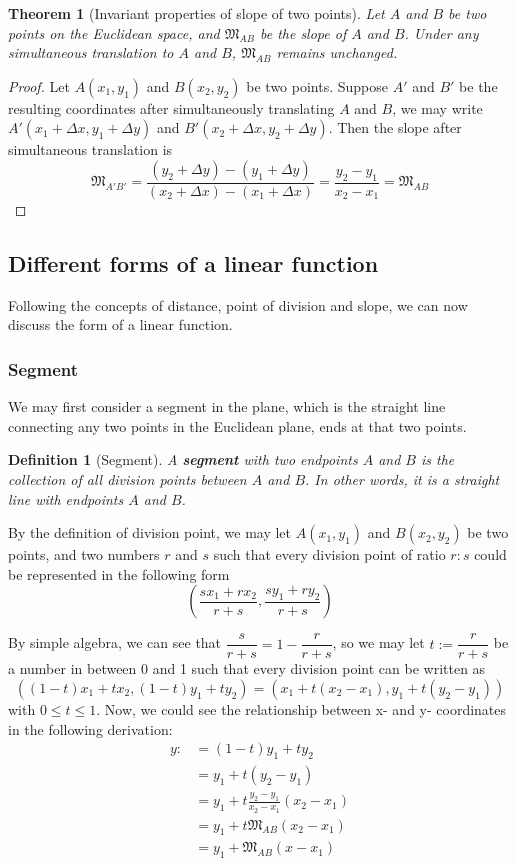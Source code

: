 \documentclass[12pt]{article}
\newtheorem{definition}{Definition}[section]
\newtheorem*{theorem}{Theorem}
\begin{document}
    \begin{theorem}[Invariant properties of slope of two points]
        Let $A$ and $B$ be two points on the Euclidean space, and $\mathfrak{M}_{AB}$ be the slope of $A$ and $B$. Under any simultaneous translation to $A$ and $B$, $\mathfrak{M}_{AB}$ remains unchanged.
    \end{theorem}

    \begin{proof}
        Let $A(x_1,y_1)$ and $B(x_2,y_2)$ be two points. Suppose $A'$ and $B'$ be the resulting coordinates after simultaneously translating $A$ and $B$, we may write $A'(x_1+\Delta x, y_1+\Delta y)$ and $B'(x_2+\Delta x, y_2+\Delta y)$. Then the slope after simultaneous translation is $$\mathfrak{M}_{A'B'}=\frac{(y_2+\Delta y)-(y_1+\Delta y)}{(x_2+\Delta x)-(x_1+\Delta x)}=\frac{y_2-y_1}{x_2-x_1}=\mathfrak{M}_{AB}$$
    \end{proof}

    \subsection{Different forms of a linear function}

    Following the concepts of distance, point of division and slope, we can now discuss the form of a linear function.

    \subsubsection*{Segment}

    We may first consider a segment in the plane, which is the straight line connecting any two points in the Euclidean plane, ends at that two points.

    \begin{definition}[Segment]
        A \textbf{segment} with two endpoints $A$ and $B$ is the collection of all division points between $A$ and $B$. In other words, it is a straight line with endpoints $A$ and $B$.
    \end{definition}

    By the definition of division point, we may let $A(x_1,y_1)$ and $B(x_2,y_2)$ be two points, and two numbers $r$ and $s$ such that every division point of ratio $r:s$ could be represented in the following form $$(\frac{sx_1+rx_2}{r+s},\frac{sy_1+ry_2}{r+s})$$

    By simple algebra, we can see that $\dfrac{s}{r+s}=1-\dfrac{r}{r+s}$, so we may let $t:=\dfrac{r}{r+s}$ be a number in between 0 and 1 such that every division point can be written as $$((1-t)x_1+tx_2, (1-t)y_1+ty_2)=(x_1+t(x_2-x_1),y_1+t(y_2-y_1))$$ with $0\leq t\leq 1$. Now, we could see the relationship between x- and y- coordinates in the following derivation:\begin{align*}
        y:&=(1-t)y_1+ty_2\\
        &=y_1+t(y_2-y_1)\\
        &=y_1+t\frac{y_2-y_1}{x_2-x_1}(x_2-x_1)\\
        &=y_1+t\mathfrak{M}_{AB}(x_2-x_1)\\
        &=y_1+\mathfrak{M}_{AB}(x-x_1)
    \end{align*}
\end{document}
